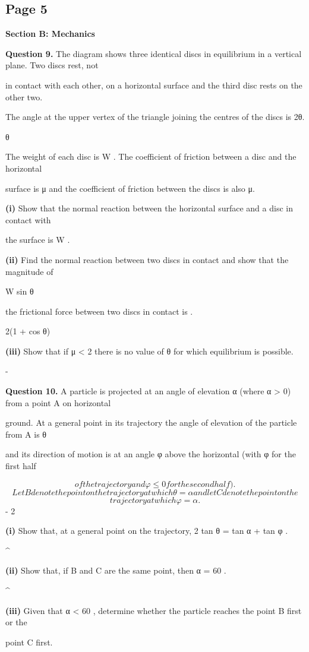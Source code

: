 \documentclass[12pt]{article}
\begin{document}
\subsection*{Page 5}
\begin{flushleft}
\bigskip\textbf{Section B: Mechanics}\par
\bigskip\textbf{Question 9.} The diagram shows three identical discs in equilibrium in a vertical plane. Two discs rest, not\par
in contact with each other, on a horizontal surface and the third disc rests on the other two.\par
The angle at the upper vertex of the triangle joining the centres of the discs is 2θ.\par
θ\par
The weight of each disc is W . The coefficient of friction between a disc and the horizontal\par
surface is μ and the coefficient of friction between the discs is also μ.\par
\textbf{(i)} Show that the normal reaction between the horizontal surface and a disc in contact with\par
the surface is W .\par
\textbf{(ii)} Find the normal reaction between two discs in contact and show that the magnitude of\par
W sin θ\par
the frictional force between two discs in contact is .\par
2(1 + cos θ)\par
\textbf{(iii)} Show that if μ < 2  there is no value of θ for which equilibrium is possible.\par
-\par
\bigskip\textbf{Question 10.} A particle is projected at an angle of elevation α (where α > 0) from a point A on horizontal\par
ground. At a general point in its trajectory the angle of elevation of the particle from A is θ\par
and its direction of motion is at an angle φ above the horizontal (with φ  for the first half\par
\[of the trajectory and φ \leq 0 for the second half).\]
\[Let B denote the point on the trajectory at which θ = α and let C denote the point on the\]
\[trajectory at which φ = α.\]
- 2\par
\textbf{(i)} Show that, at a general point on the trajectory, 2 tan θ = tan α + tan φ .\par
\textasciicircum{}\circ\par
\textbf{(ii)} Show that, if B and C are the same point, then α = 60 .\par
\textasciicircum{}\circ\par
\textbf{(iii)} Given that α < 60 , determine whether the particle reaches the point B first or the\par
point C first.\par
\end{flushleft}
\end{document}
